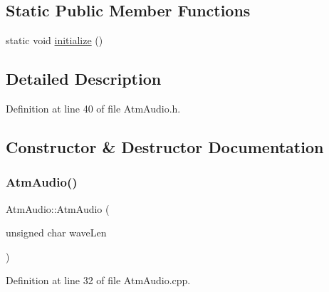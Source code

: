 \subsection*{Static Public Member Functions}
\begin{DoxyCompactItemize}
\item 
static void \hyperlink{class_atm_audio_ada27d4d2556b8b27f4c3c8b4da763176}{initialize} ()
\end{DoxyCompactItemize}


\subsection{Detailed Description}


Definition at line 40 of file Atm\+Audio.\+h.



\subsection{Constructor \& Destructor Documentation}
\mbox{\label{class_atm_audio_adef4ded5a0c213fe421025e17de0605e}} 
\subsubsection{\texorpdfstring{Atm\+Audio()}{AtmAudio()}}
{\footnotesize\ttfamily Atm\+Audio\+::\+Atm\+Audio (\begin{DoxyParamCaption}\item[{unsigned char}]{wave\+Len }\end{DoxyParamCaption})}



Definition at line 32 of file Atm\+Audio.\+cpp.

